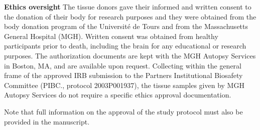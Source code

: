 \documentclass{article}
\begin{document}
\noindent \textbf{Ethics oversight} The tissue donors gave their informed and written consent to the donation of their body for research purposes and they were obtained from the body donation program of the Université de Tours and from the Massachusetts General Hospital (MGH). Written consent was obtained from healthy participants prior to death, including the brain for any educational or research purposes. The authorization documents are kept with the MGH Autopsy Services in Boston, MA, and are available upon request. Collecting within the general frame of the approved IRB submission to the Partners Institutional Biosafety Committee (PIBC., protocol 2003P001937), the tissue samples given by MGH Autopsy Services do not require a specific ethics approval documentation.

\noindent Note that full information on the approval of the study protocol must also be provided in the manuscript.
\end{document}
